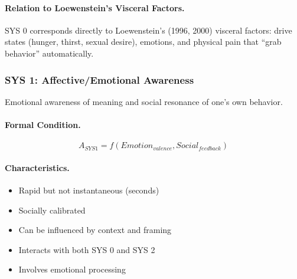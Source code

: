 \paragraph{Relation to Loewenstein's Visceral Factors.}
SYS 0 corresponds directly to Loewenstein's (1996, 2000) visceral factors:
drive states (hunger, thirst, sexual desire), emotions, and physical pain
that ``grab behavior'' automatically.

\subsubsection{SYS 1: Affective/Emotional Awareness}

\begin{definition}
\label{def:sys1}
Emotional awareness of meaning and social resonance of one's own behavior.
\end{definition}

\paragraph{Formal Condition.}
\begin{equation}
A_{SYS1} = f(Emotion_{valence}, Social_{feedback})
\end{equation}

\paragraph{Characteristics.}
\begin{itemize}
\item Rapid but not instantaneous (seconds)
\item Socially calibrated
\item Can be influenced by context and framing
\item Interacts with both SYS 0 and SYS 2
\item Involves emotional processing
\end{itemize}

